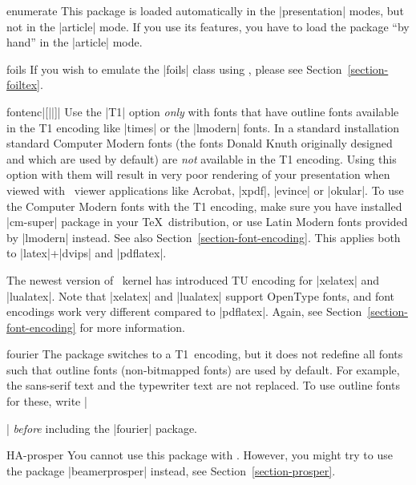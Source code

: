 \begin{package}{{enumerate}}
  \articlenote
  This package is loaded automatically in the |presentation| modes, but not in the |article| mode. If you use its features, you have to load the package ``by hand'' in the |article| mode.
\end{package}

\begin{class}{{foils}}
  If you wish to emulate the |foils| class using \beamer, please see Section~\ref{section-foiltex}.
\end{class}

\begin{package}{{fontenc}|[||]|}
  Use the |T1| option \emph{only} with fonts that have outline fonts available in the T1 encoding like |times| or the |lmodern| fonts. In a standard installation standard Computer Modern fonts (the fonts Donald Knuth originally designed and which are used by default) are \emph{not} available in the T1 encoding. Using this option with them will result in very poor rendering of your presentation when viewed with \pdf\ viewer applications like Acrobat, |xpdf|, |evince| or |okular|. To use the Computer Modern fonts with the T1 encoding, make sure you have installed |cm-super| package in your \TeX\ distribution, or use Latin Modern fonts provided by |lmodern| instead. See also Section~\ref{section-font-encoding}. This applies both to |latex|+|dvips| and |pdflatex|.

  The newest version of \LaTeXe\ kernel has introduced TU encoding for |xelatex| and |lualatex|. Note that |xelatex| and |lualatex| support OpenType fonts, and font encodings work very different compared to |pdflatex|. Again, see Section~\ref{section-font-encoding} for more information.
\end{package}

\begin{package}{{fourier}}
  The package switches to a T1~encoding, but it does not redefine all fonts such that outline fonts (non-bitmapped fonts) are used by default. For example, the sans-serif text and the typewriter text are not replaced. To use outline fonts for these, write |\usepackage{lmodern}| \emph{before} including the |fourier| package.
\end{package}

\begin{package}{{HA-prosper}}
  You cannot use this package with \beamer. However, you might try to use the package |beamerprosper| instead, see Section~\ref{section-prosper}.
\end{package}

